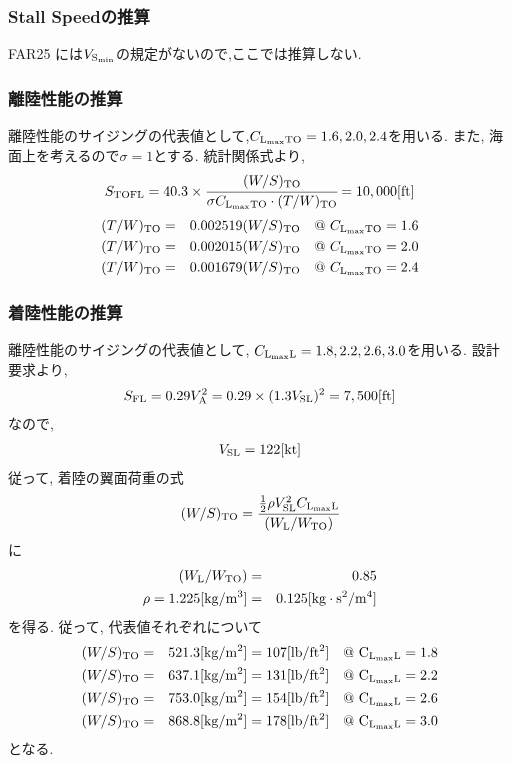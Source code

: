 \documentclass[12pt]{jsarticle}
\begin{document}
\subsubsection{Stall Speedの推算}
FAR25 には$V_{\rm S_{min}}$の規定がないので,ここでは推算しない.
\subsubsection{離陸性能の推算}
離陸性能のサイジングの代表値として,$C_{\rm L_{max}TO} = 1.6, 2.0, 2.4$を用いる. また, 海面上を考えるので$\sigma = 1$とする. 統計関係式より,
\begin{eqnarray*}
S_{\rm TOFL} = 40.3 \times \cfrac{(W/S)_{\rm TO}}{\sigma C_{\rm L_{max}TO} \cdot(T/W)_{\rm TO}} = 10,000 [\rm ft]
\end{eqnarray*}
\begin{eqnarray*}
(T/W)_{\rm TO} &=& 0.002519(W/S)_{\rm TO} \quad @ \ C_{\rm L_{max}TO} = 1.6 \\
(T/W)_{\rm TO} &=& 0.002015(W/S)_{\rm TO} \quad @ \ C_{\rm L_{max}TO} = 2.0 \\
(T/W)_{\rm TO} &=& 0.001679(W/S)_{\rm TO} \quad @ \ C_{\rm L_{max}TO} = 2.4 \\
\end{eqnarray*}

\subsubsection{着陸性能の推算}
離陸性能のサイジングの代表値として, $C_{\rm L_{max}L} = 1.8, 2.2, 2.6, 3.0$を用いる. 設計要求より,
\begin{eqnarray*}
S_{\rm FL} = 0.29V_{\rm A}^2 = 0.29 \times (1.3V_{\rm SL})^2 = 7,500 [\rm ft]
\end{eqnarray*}
なので, 
\begin{eqnarray*}
V_{\rm SL} = 122 [\rm kt]
\end{eqnarray*}
従って, 着陸の翼面荷重の式
\begin{eqnarray*}
(W/S)_{\rm TO} = \cfrac{\frac{1}{2} \rho V_{\rm SL}^2 C_{\rm L_{max}L}}{(W_{\rm L} / W_{\rm TO})}
\end{eqnarray*}
に
\begin{eqnarray*}
(W_{\rm L} / W_{\rm TO}) &=& 0.85 \\
\rho = 1.225 [\rm kg/m^3] &=& 0.125 [\rm kg \cdot s^2 / m^4]
\end{eqnarray*}
を得る. 従って, 代表値それぞれについて
\begin{eqnarray*}
(W/S)_{\rm TO} &=& 521.3 [\rm kg/m^2 ] = 107 [\rm lb/ft^2 ] \quad @ \ C_{\rm L_{max}L} = 1.8 \\
(W/S)_{\rm TO} &=& 637.1 [\rm kg/m^2 ] = 131 [\rm lb/ft^2 ] \quad @ \ C_{\rm L_{max}L} = 2.2 \\
(W/S)_{\rm TO} &=& 753.0 [\rm kg/m^2 ] = 154 [\rm lb/ft^2 ] \quad @ \ C_{\rm L_{max}L} = 2.6 \\
(W/S)_{\rm TO} &=& 868.8 [\rm kg/m^2 ] = 178 [\rm lb/ft^2 ] \quad @ \ C_{\rm L_{max}L} = 3.0 \\
\end{eqnarray*}
となる.
\end{document}
